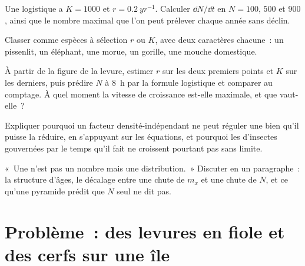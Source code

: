 \begin{exercise}[$\star\star$]\label{exo:b1:populations:8}
Une  logistique a $K = 1000$ et $r = \qty{0.2}{yr^{-1}}$.
Calculer $\dd N/\dd t$ en $N = 100$, $500$ et $900$, ainsi que le
nombre maximal que l'on peut prélever chaque année sans déclin.
\end{exercise}

\begin{exercise}[$\star\star$]\label{exo:b1:populations:9}
Classer comme espèces à sélection $r$ ou $K$, avec deux caractères
chacune~: un pissenlit, un éléphant, une morue, un gorille, une mouche
domestique.
\end{exercise}

\begin{exercise}[$\star\star\star$]\label{exo:b1:populations:10}
À partir de la figure de la levure, estimer $r$ sur les deux premiers
points et $K$ sur les derniers, puis prédire $N$ à \qty{8}{h} par la
formule logistique et comparer au comptage. À quel moment la vitesse
de croissance est-elle maximale, et que vaut-elle~?
\end{exercise}

\begin{exercise}[$\star\star\star$]\label{exo:b1:populations:11}
Expliquer pourquoi un facteur densité-indépendant ne peut réguler une
 bien qu'il puisse la réduire, en s'appuyant sur les
équations, et pourquoi les  d'insectes gouvernées par le
temps qu'il fait ne croissent pourtant pas sans limite.
\end{exercise}

\begin{exercise}[$\star\star\star$]\label{exo:b1:populations:12}
«~Une  n'est pas un nombre mais une distribution.~» Discuter
en un paragraphe~: la structure d'âges, le décalage entre une chute de
$m_x$ et une chute de $N$, et ce qu'une pyramide prédit que $N$ seul ne
dit pas.
\end{exercise}

\section{Problème~: des levures en fiole et des cerfs sur une île}

